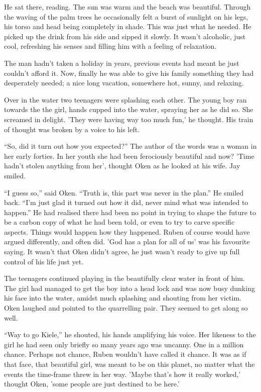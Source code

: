 He sat there, reading.  The sun was warm and the beach was beautiful.  Through the waving of the palm trees he occasionally felt a burst of sunlight on his legs, his torso and head being completely in shade.  This was just what he needed.  He picked up the drink from his side and sipped it slowly.  It wasn't alcoholic, just cool, refreshing his senses and filling him with a feeling of relaxation.

The man hadn't taken a holiday in years, previous events had meant he just couldn't afford it.  Now, finally he was able to give his family something they had desperately needed; a nice long vacation, somewhere hot, sunny, and relaxing.

Over in the water two teenagers were splashing each other.  The young boy ran towards the the girl, hands cupped into the water, spraying her as he did so.  She screamed in delight.  'They were having way too much fun,' he thought.  His train of thought was broken by a voice to his left.

``So, did it turn out how you expected?''  The author of the words was a woman in her early forties.  In her youth she had been ferociously beautiful and now?  'Time hadn't stolen anything from her', thought Oken as he looked at his wife.  Jay smiled.

``I guess so,'' said Oken.  ``Truth is, this part was never in the plan.''  He smiled back.  ``I'm just glad it turned out how it did, never mind what was intended to happen.''  He had realised there had been no point in trying to shape the future to be a carbon copy of what he had been told, or even to try to carve specific aspects.  Things would happen how they happened.  Ruben of course would have argued differently, and often did.  'God has a plan for all of us' was his favourite saying.  It wasn't that Oken didn't agree, he just wasn't ready to give up full control of his life just yet.  

The teenagers continued playing in the beautifully clear water in front of him.  The girl had managed to get the boy into a head lock and was now busy dunking his face into the water, amidst much splashing and shouting from her victim.  Oken laughed and pointed to the quarrelling pair.  They seemed to get along so well.

``Way to go Kiele,'' he shouted, his hands amplifying his voice.  Her likeness to the girl he had seen only briefly so many years ago was uncanny.  One in a million chance.  Perhaps not chance, Ruben wouldn't have called it chance.  It was as if that face, that beautiful girl, was meant to be on this planet, no matter what the events the time-frame threw in her way.  'Maybe that's how it really worked,' thought Oken, 'some people are just destined to be here.'  

